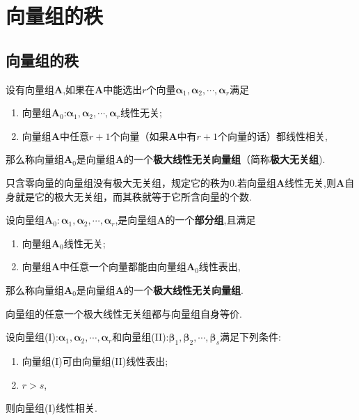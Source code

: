 \documentclass[9pt,a4paper]{book}
\begin{document}
\section{向量组的秩}
\subsection{向量组的秩}
\begin{defination}[极大线性无关组的定义]
	设有向量组$ \bm{A} $,如果在$ \bm{A} $中能选出$ r $个向量$ \bm{\alpha}_1,\bm{\alpha}_2,\cdots,\bm{\alpha}_r $满足
\begin{enumerate}[(1)]
\item  向量组$ \bm{A}_0$:$ \bm{\alpha}_1,\bm{\alpha}_2,\cdots,\bm{\alpha}_r $线性无关;
\item  向量组$ \bm{A} $中任意$ r+1  $个向量（如果$ \bm{A} $中有$ r+1  $个向量的话）都线性相关,
\end{enumerate}
	那么称向量组$ \bm{A}_0 $是向量组$ \bm{A} $的一个\textbf{极大线性无关向量组}（简称\textbf{极大无关组}).
	
	只含零向量的向量组没有极大无关组，规定它的秩为$ 0 $.若向量组$ \bm{A} $线性无关,则$ \bm{A} $自身就是它的极大无关组，而其秩就等于它所含向量的个数.
\end{defination}
\begin{inference}
		设向量组$ \bm{A}_0:\bm{\alpha}_1,\bm{\alpha}_2,\cdots,\bm{\alpha}_r $,是向量组$ \bm{A} $的一个\textbf{部分组},且满足
	\begin{enumerate}[(1)]
		\item  向量组$ \bm{A}_0$线性无关;
		\item  向量组$ \bm{A} $中任意一个向量都能由向量组$ \bm{A}_0$线性表出,
	\end{enumerate}
	那么称向量组$ \bm{A}_0 $是向量组$ \bm{A} $的一个\textbf{极大线性无关向量组}.
\end{inference}
\begin{theorem}
	向量组的任意一个极大线性无关组都与向量组自身等价.
\end{theorem}
\begin{theorem}
	设向量组(I):$ \bm{\alpha}_1,\bm{\alpha}_2,\cdots,\bm{\alpha}_r $和向量组(II):$ \bm{\beta}_1,\bm{\beta}_2,\cdots,\bm{\beta}_s $满足下列条件:
	\begin{enumerate}[(1)]
		\item 向量组(I)可由向量组(II)线性表出;
		\item $ r>s $,
	\end{enumerate}
则向量组(I)线性相关.
\end{theorem}
\end{document}
